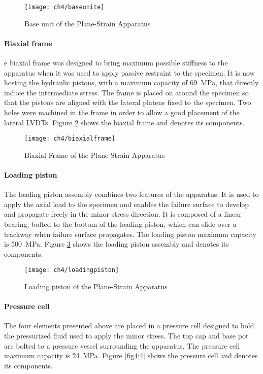 \begin{figure}[tb]
    \centering
    \texttt{[image: ch4/baseunite]}
    \caption{Base unit of the Plane-Strain Apparatus}
    \label{fig4:1}
\end{figure} 

\paragraph{Biaxial frame}

e biaxial frame was designed to bring maximum possible stiffness to the apparatus when it was used to apply passive restraint to the specimen. It is now hosting the hydraulic pistons, with a maximum capacity of \SI{69}{MPa}, that directly induce the intermediate stress. The frame is placed on around the specimen so that the pistons are aligned with the lateral platens fixed to the specimen. Two holes were machined in the frame in order to allow a good placement of the lateral LVDTs. Figure \ref{fig4:2} shows the biaxial frame and denotes its components. 


\begin{figure}[tb]
    \centering
    \texttt{[image: ch4/biaxialframe]}
    \caption{Biaxial Frame of the Plane-Strain Apparatus}
    \label{fig4:2}
\end{figure} 

\paragraph{Loading piston} The loading piston assembly combines two features of the apparatus. It is used to apply the axial load to the specimen and enables the failure surface to develop and propagate freely in the minor stress direction. It is composed of a linear bearing, bolted to the bottom of the loading piston, which can slide over a trackway when failure surface propagates. The loading piston maximum capacity is \SI{500}{MPa}. Figure \ref{fig4:3} shows the loading piston assembly and denotes its components.


\begin{figure}[tb]
    \centering
    \texttt{[image: ch4/loadingpiston]}
    \caption{Loading piston of the Plane-Strain Apparatus}
    \label{fig4:3}
\end{figure} 

\paragraph{Pressure cell} The four elements presented above are placed in a pressure cell designed to hold the pressurized fluid used to apply the minor stress. The top cap and base pot are bolted to a pressure vessel surrounding the apparatus. The pressure cell maximum capacity is \SI{24}{MPa}. Figure \ref{fig4:4} shows the pressure cell and denotes its components.


